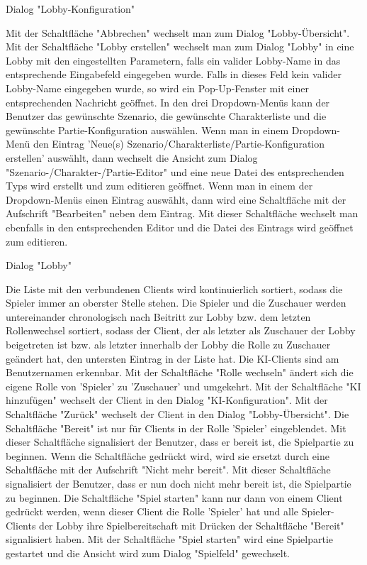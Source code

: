 

Dialog "Lobby-Konfiguration"

Mit der Schaltfläche "Abbrechen" wechselt man zum Dialog "Lobby-Übersicht".
Mit der Schaltfläche "Lobby erstellen" wechselt man zum Dialog "Lobby" in eine Lobby mit den eingestellten Parametern, falls ein valider Lobby-Name in das entsprechende Eingabefeld eingegeben wurde.
Falls in dieses Feld kein valider Lobby-Name eingegeben wurde, so wird ein Pop-Up-Fenster mit einer entsprechenden Nachricht geöffnet.
In den drei Dropdown-Menüs kann der Benutzer das gewünschte Szenario, die gewünschte Charakterliste und die gewünschte Partie-Konfiguration auswählen. Wenn man in einem Dropdown-Menü den Eintrag 'Neue(s) Szenario/Charakterliste/Partie-Konfiguration erstellen' auswählt, dann wechselt die Ansicht zum Dialog "Szenario-/Charakter-/Partie-Editor" und eine neue Datei des entsprechenden Typs wird erstellt und zum editieren geöffnet.
Wenn man in einem der Dropdown-Menüs einen Eintrag auswählt, dann wird eine Schaltfläche mit der Aufschrift "Bearbeiten" neben dem Eintrag. Mit dieser Schaltfläche wechselt man ebenfalls in den entsprechenden Editor und die Datei des Eintrags wird geöffnet zum editieren.

Dialog "Lobby"

Die Liste mit den verbundenen Clients wird kontinuierlich sortiert, sodass die Spieler immer an oberster Stelle stehen. Die Spieler und die Zuschauer werden untereinander chronologisch nach Beitritt zur Lobby bzw. dem letzten Rollenwechsel sortiert, sodass der Client, der als letzter als Zuschauer der Lobby beigetreten ist bzw. als letzter innerhalb der Lobby die Rolle zu Zuschauer geändert hat, den untersten Eintrag in der Liste hat. Die KI-Clients sind am Benutzernamen erkennbar. 
Mit der Schaltfläche "Rolle wechseln" ändert sich die eigene Rolle von 'Spieler' zu 'Zuschauer' und umgekehrt. 
Mit der Schaltfläche "KI hinzufügen" wechselt der Client in den Dialog "KI-Konfiguration".
Mit der Schaltfläche "Zurück" wechselt der Client in den Dialog "Lobby-Übersicht".
Die Schaltfläche "Bereit" ist nur für Clients in der Rolle 'Spieler' eingeblendet. Mit dieser Schaltfläche signalisiert der Benutzer, dass er bereit ist, die Spielpartie zu beginnen. Wenn die Schaltfläche gedrückt wird, wird sie ersetzt durch eine Schaltfläche mit der Aufschrift "Nicht mehr bereit". Mit dieser Schaltfläche signalisiert der Benutzer, dass er nun doch nicht mehr bereit ist, die Spielpartie zu beginnen. Die Schaltfläche "Spiel starten" kann nur dann von einem Client gedrückt werden, wenn dieser Client die Rolle 'Spieler' hat und alle Spieler-Clients der Lobby ihre Spielbereitschaft mit Drücken der Schaltfläche "Bereit" signalisiert haben.
Mit der Schaltfläche "Spiel starten" wird eine Spielpartie gestartet und die Ansicht wird zum Dialog "Spielfeld" gewechselt.

